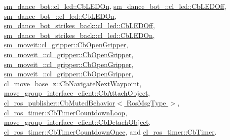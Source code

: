 \hyperlink{classsm__dance__bot_1_1cl__led_1_1CbLEDOn_a60a82058c585b4d0398b531c1e1bdf0b}{sm\+\_\+dance\+\_\+bot\+::cl\+\_\+led\+::\+Cb\+L\+E\+D\+On}, \hyperlink{classsm__dance__bot__2_1_1cl__led_1_1CbLEDOff_a6ca7b3ba30347c4be33d3b4946009325}{sm\+\_\+dance\+\_\+bot\+\_\+::cl\+\_\+led\+::\+Cb\+L\+E\+D\+Off}, \hyperlink{classsm__dance__bot__2_1_1cl__led_1_1CbLEDOn_a461d3e1829d785ab490fce9827868e39}{sm\+\_\+dance\+\_\+bot\+\_\+::cl\+\_\+led\+::\+Cb\+L\+E\+D\+On}, \hyperlink{classsm__dance__bot__strikes__back_1_1cl__led_1_1CbLEDOff_a6b4ac6e1c516ced8515e6b6641c5d063}{sm\+\_\+dance\+\_\+bot\+\_\+strikes\+\_\+back\+::cl\+\_\+led\+::\+Cb\+L\+E\+D\+Off}, \hyperlink{classsm__dance__bot__strikes__back_1_1cl__led_1_1CbLEDOn_aadafa99cd7c683a9d1ae59b5158826d9}{sm\+\_\+dance\+\_\+bot\+\_\+strikes\+\_\+back\+::cl\+\_\+led\+::\+Cb\+L\+E\+D\+On}, \hyperlink{classsm__moveit_1_1cl__gripper_1_1CbOpenGripper_a16cdbe39be1b1789880bae04fa87531c}{sm\+\_\+moveit\+::cl\+\_\+gripper\+::\+Cb\+Open\+Gripper}, \hyperlink{classsm__moveit__2_1_1cl__gripper_1_1CbOpenGripper_ab72fa9429628aa78b2bb1276ff7d390a}{sm\+\_\+moveit\+\_\+::cl\+\_\+gripper\+::\+Cb\+Open\+Gripper}, \hyperlink{classsm__moveit__3_1_1cl__gripper_1_1CbOpenGripper_a91085c752bc1d9cfadd65031b8b64c46}{sm\+\_\+moveit\+\_\+::cl\+\_\+gripper\+::\+Cb\+Open\+Gripper}, \hyperlink{classsm__moveit__4_1_1cl__gripper_1_1CbOpenGripper_ab5355c50786f7f598ee6ca5650d56fbe}{sm\+\_\+moveit\+\_\+::cl\+\_\+gripper\+::\+Cb\+Open\+Gripper}, \hyperlink{classcl__move__base__z_1_1CbNavigateNextWaypoint_a1a848f7bfedd23fea7de59a940257b05}{cl\+\_\+move\+\_\+base\+\_\+z\+::\+Cb\+Navigate\+Next\+Waypoint}, \hyperlink{classmove__group__interface__client_1_1CbAttachObject_a99efdfdd854a2a9633c92b33a78fcd34}{move\+\_\+group\+\_\+interface\+\_\+client\+::\+Cb\+Attach\+Object}, \hyperlink{classcl__ros__publisher_1_1CbMutedBehavior_a4c02187c58358fa811777d9956510222}{cl\+\_\+ros\+\_\+publisher\+::\+Cb\+Muted\+Behavior$<$ Ros\+Msg\+Type $>$}, \hyperlink{classcl__ros__timer_1_1CbTimerCountdownLoop_a5623e9fdd8f0fb23e8707f7816c099d6}{cl\+\_\+ros\+\_\+timer\+::\+Cb\+Timer\+Countdown\+Loop}, \hyperlink{classmove__group__interface__client_1_1CbDetachObject_a43c672ede95c7dc49f98b5b7b623c43f}{move\+\_\+group\+\_\+interface\+\_\+client\+::\+Cb\+Detach\+Object}, \hyperlink{classcl__ros__timer_1_1CbTimerCountdownOnce_ab602b778a299b42e8cc9f4bf3da0a234}{cl\+\_\+ros\+\_\+timer\+::\+Cb\+Timer\+Countdown\+Once}, and \hyperlink{classcl__ros__timer_1_1CbTimer_a04184e2679c32363c876e1d6b4746072}{cl\+\_\+ros\+\_\+timer\+::\+Cb\+Timer}.



